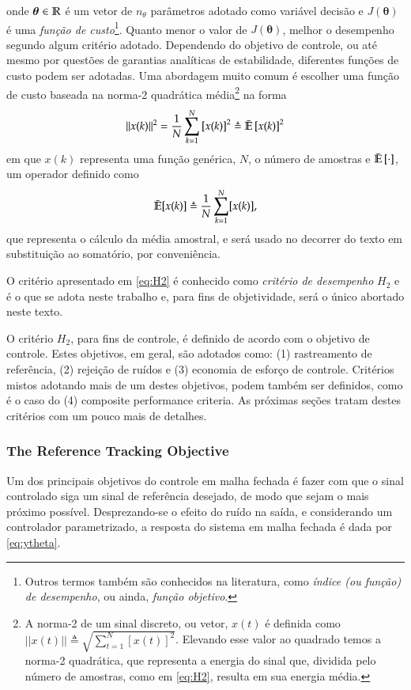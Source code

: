 onde $\bm{\theta} \in \mathbb{R}$ é um vetor de $n_{\theta}$ parâmetros adotado como variável decisão e $J(\bm{\theta})$ é uma \textit{função de custo}\footnote{Outros termos também são conhecidos na literatura, como \textit{índice (ou função) de desempenho}, ou ainda, \textit{função objetivo}.}. Quanto menor o valor de $J(\bm{\theta})$, melhor o desempenho segundo algum critério adotado. Dependendo do objetivo de controle, ou até mesmo por questões de garantias analíticas de estabilidade, diferentes funções de custo podem ser adotadas. Uma abordagem muito comum é escolher uma função de custo baseada na  norma-2 quadrática média\footnote{A norma-2 de um sinal discreto, ou vetor, $x(t)$ é definida como $||x(t)|| \triangleq \sqrt{ \sum_{t=1}^{N} [x(t)]^{2} }$. Elevando esse valor ao quadrado temos a norma-2 quadrática, que representa a energia do sinal que, dividida pelo número de amostras, como em \eqref{eq:H2}, resulta em sua energia média.}
na forma
\begin{equation}
   ||x(k)||^{2} =\frac{1}{N}\sum_{k=1}^{N} \left[ x(k) \right]^{2} \triangleq \bar{\mathbb{E}} \left[ x(k) \right]^{2}
   \label{eq:H2}
\end{equation}
em que $x(k)$ representa uma função genérica, $N$, o número de amostras e $\bar{\mathbb{E}}\left[ \cdot \right] $, um operador definido como
\begin{equation}
   \bar{\mathbb{E}}[x(k)] \triangleq \frac{1}{N}\sum_{k=1}^{N} [x(k)],
\end{equation}
que representa o cálculo da média amostral, e será usado no decorrer do texto em substituição ao somatório, por conveniência.

O critério apresentado em \eqref{eq:H2} é conhecido como \textit{critério de desempenho} $H_2$ e é o que se adota neste trabalho e, para fins de objetividade, será o único abortado neste texto.

O critério  $H_2$, para fins de controle, é definido de acordo com o objetivo de controle. Estes objetivos, em geral, são adotados como: (1) rastreamento de referência, (2) rejeição de ruídos e (3) economia de esforço de controle. Critérios mistos adotando mais de um destes objetivos, podem também ser definidos, como é o caso do (4) composite performance criteria. As próximas seções tratam destes critérios com um pouco mais de detalhes.


\subsubsection{The Reference Tracking Objective}%
\label{sub:the_reference_tracking_objective}
Um dos principais objetivos do controle em malha fechada é fazer com que o sinal controlado siga um sinal de referência desejado, de modo que sejam o mais próximo possível. Desprezando-se o efeito do ruído na saída, e considerando um controlador parametrizado, a resposta do sistema em malha fechada é dada por \eqref{eq:ytheta}.

